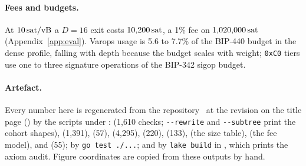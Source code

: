 \iffullversion
\paragraph{Fees and budgets.} At $10\,\mathrm{sat}/\mathrm{vB}$ a $D=16$ exit
costs $10{,}200\,\mathrm{sat}$, a 1\% fee on $1{,}020{,}000\,\mathrm{sat}$
(Appendix~\ref{app:eval}). Varops usage is 5.6 to 7.7\% of the BIP-440
budget in the dense profile, falling with depth because the budget scales with weight;
\texttt{0xC0} tiers use one to three signature operations of the BIP-342
sigop budget.
\fi

\iffullversion
\paragraph{Artefact.} Every number here is regenerated from the
repository~\cite{layertreerepo} at the revision on the title page
(\GitHash) by the scripts under : 
(1{,}610 checks; \texttt{-{}-rewrite} and \texttt{-{}-subtree} print the
cohort shapes),  (1{,}391),  (57),
 (4{,}295),  (220), 
(133),  (the size table), 
(the fee model),  and 
(55); by \texttt{go test ./...}; and by \texttt{lake build} in
, which prints the axiom audit. Figure coordinates are
copied from these outputs by hand.
\fi
